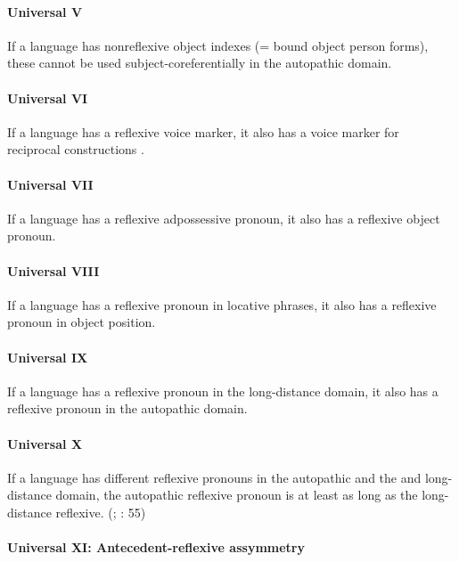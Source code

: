 \documentclass[output=paper]{langscibook}
\begin{document}
\paragraph*{Universal V} 

If a language has nonreflexive object indexes (= bound object person forms), these cannot be used subject-coreferentially in the autopathic domain.

\paragraph*{Universal VI} 

If a language has a reflexive voice marker, it also has a voice marker for reciprocal constructions \citep[141]{Dixon2012}.

\paragraph*{Universal VII} 

If a language has a reflexive adpossessive pronoun, it also has a reflexive object pronoun. \citep[50]{Haspelmath2008}

\paragraph*{Universal VIII} 

If a language has a reflexive pronoun in locative phrases, it also has a reflexive pronoun in object position. \citep[55]{Haspelmath2008}

\paragraph*{Universal IX}

If a language has a reflexive pronoun in the long-distance domain, it also has a reflexive pronoun in the autopathic domain. \citep[58]{Haspelmath2008}

\paragraph*{Universal X}

If a language has different reflexive pronouns in the autopathic and the and long-distance domain, the autopathic reflexive pronoun is at least as long as the long- distance reflexive. (\citealt{Pica1987}; \citealt{Haspelmath2008}: 55)

\paragraph*{Universal XI: Antecedent-reflexive assymmetry} 
\end{document}
